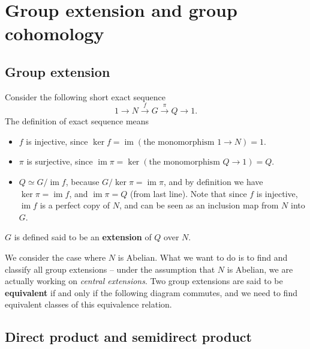 \documentclass[hyperref, a4paper]{article}
\newcommand*{\concept}[1]{{\textbf{#1}}}
\DeclareMathOperator{\im}{im}
\begin{document}
\section{Group extension and group cohomology}

\subsection{Group extension}

Consider the following short exact sequence
\begin{equation}
    1 \to N \stackrel{f}{\to} G \stackrel{\pi}{\to} Q \to 1.
    \label{eq:short-exact-sequence-group}
\end{equation}
The definition of exact sequence means 
\begin{itemize}
    \item $f$ is injective, since $\ker f = \im (\text{the monomorphism $1 \to N$}) = 1$.
    \item $\pi$ is surjective, since $\im \pi = \ker (\text{the monomorphism $Q \to 1$}) = Q$.
    \item $Q \simeq G / \im{f}$, because $G / \ker \pi = \im \pi$, and by definition we have $\ker \pi = \im f$,
    and $\im \pi = Q$ (from last line). Note that since $f$ is injective, $\im f$ is a perfect copy of $N$,
    and can be seen as an inclusion map from $N$ into $G$.
\end{itemize}
$G$ is defined said to be an \concept{extension} of $Q$ over $N$. 

We consider the case where $N$ is Abelian. What we want to do is to find and classify all group extensions
-- under the assumption that $N$ is Abelian, we are actually working on \emph{central extensions}. 
Two group extensions are said to be \concept{equivalent} if and only if the following diagram 
 commutes, and we need to find equivalent classes of 
this equivalence relation.

\subsection{Direct product and semidirect product}
\end{document}
